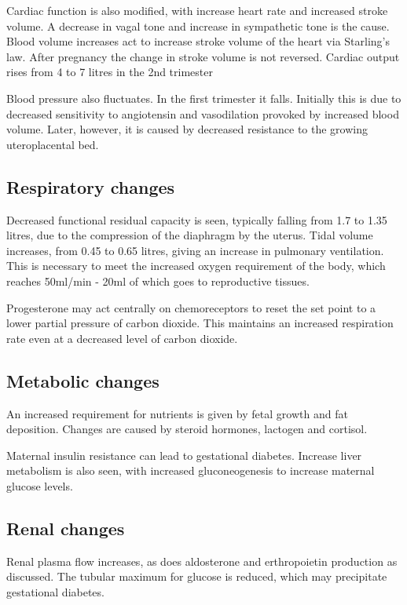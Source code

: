 \documentclass[12pt,a4paper,onecolumn]{article}
\begin{document}
Cardiac function is also modified, with increase heart rate and increased stroke volume. A decrease
in vagal tone and increase in sympathetic tone is the cause. Blood volume increases act to increase
stroke volume of the heart via Starling's law. After pregnancy the change in stroke volume is not
reversed. Cardiac output rises from 4 to 7 litres in the 2nd trimester

Blood pressure also fluctuates. In the first trimester it falls. Initially this is due to decreased
sensitivity to angiotensin and vasodilation provoked by increased blood volume. Later, however, it
is caused by decreased resistance to the growing uteroplacental bed.

\subsection{Respiratory changes}

Decreased functional residual capacity is seen, typically falling from 1.7 to 1.35 litres, due to
the compression of the diaphragm by the uterus. Tidal volume increases, from 0.45 to 0.65 litres,
giving an increase in pulmonary ventilation. This is necessary to meet the increased oxygen
requirement of the body, which reaches 50ml/min - 20ml of which goes to reproductive tissues.

Progesterone may act centrally on chemoreceptors to reset the set point to a lower partial pressure
of carbon dioxide. This maintains an increased respiration rate even at a decreased level of carbon
dioxide.

\subsection{Metabolic changes}

An increased requirement for nutrients is given by fetal growth and fat deposition. Changes are
caused by steroid hormones, lactogen and cortisol.

Maternal insulin resistance can lead to gestational diabetes. Increase liver metabolism is also
seen, with increased gluconeogenesis to increase maternal glucose levels.

\subsection{Renal changes}

Renal plasma flow increases, as does aldosterone and erthropoietin production as discussed. The
tubular maximum for glucose is reduced, which may precipitate gestational diabetes.
\end{document}

